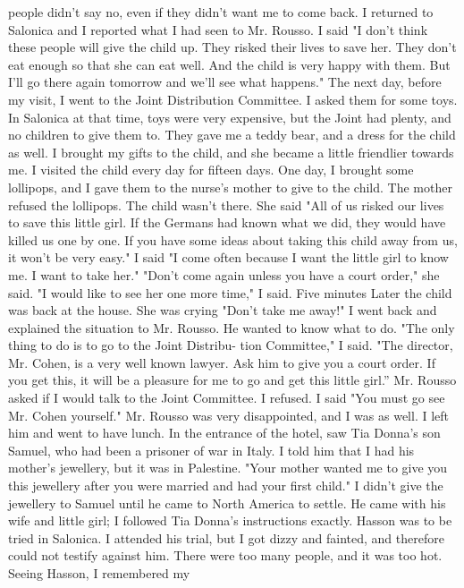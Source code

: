 people didn't say no, even if they didn't want me to come back. 
I returned to Salonica and I reported what I had seen to Mr. Rousso. 
I said "I don't think these people will give the child up. They risked 
their lives to save her. They don't eat enough so that she can eat well. 
And the child is very happy with them. But I'll go there again tomorrow 
and we'll see what happens." 
The next day, before my visit, I went to the Joint Distribution 
Committee. I asked them for some toys. In Salonica at that time, toys 
were very expensive, but the Joint had plenty, and no children to give 
them to. They gave me a teddy bear, and a dress for the child as well. 
I brought my gifts to the child, and she became a little friendlier towards me. 
I visited the child every day for fifteen days. One day, I brought 
some lollipops, and I gave them to the nurse's mother to give to the 
child. The mother refused the lollipops. The child wasn't there. She 
said "All of us risked our lives to save this little girl. If the Germans had known what we did, they would have killed us one by one. If you 
have some ideas about taking this child away from us, it won't be very 
easy." 
I said "I come often because I want the little girl to know me. I 
want to take her." 
"Don't come again unless you have a court order," she said. 
"I would like to see her one more time," I said. Five minutes Later 
the child was back at the house. She was crying "Don't take me away!" 
I went back and explained the situation to Mr. Rousso. He wanted to 
know what to do. "The only thing to do is to go to the Joint Distribu-
tion Committee," I said. "The director, Mr. Cohen, is a very well known 
lawyer. Ask him to give you a court order. If you get this, it will be 
a pleasure for me to go and get this little girl.” Mr. Rousso asked
if I would talk to the Joint Committee. I refused. I said "You must 
go see Mr. Cohen yourself." Mr. Rousso was very disappointed, and I was 
as well. 
I left him and went to have lunch. In the entrance of the hotel, 
saw Tia Donna's son Samuel, who had been a prisoner of war in Italy. I 
told him that I had his mother's jewellery, but it was in Palestine. 
"Your mother wanted me to give you this jewellery after you were married 
and had your first child." I didn't give the jewellery to Samuel until 
he came to North America to settle. He came with his wife and little 
girl; I followed Tia Donna's instructions exactly. 
Hasson was to be tried in Salonica. I attended his trial, but I 
got dizzy and fainted, and therefore could not testify against him. There 
were too many people, and it was too hot. Seeing Hasson, I remembered my 
